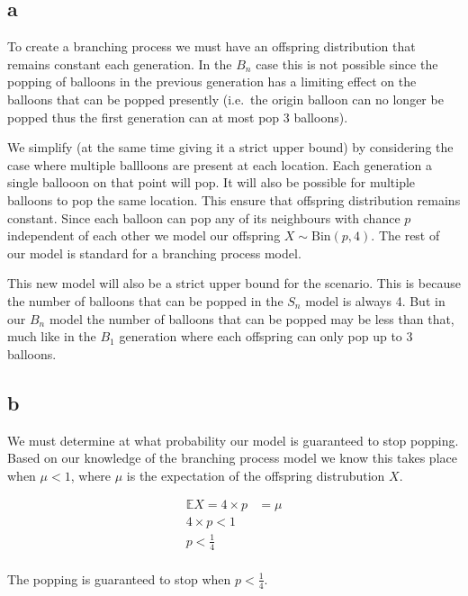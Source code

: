 \documentclass{article}
\newcommand{\expect}{\mathbb{E}}
\begin{document}
\subsection{a}
To create a branching process we must have an offspring distribution that
remains constant each generation. In the $B_n$ case this is not possible
since the popping of balloons in the previous generation has a limiting
effect on the balloons that can be popped presently (i.e.\ the origin
balloon can no longer be popped thus the first generation can at most pop
3 balloons).

We simplify (at the same time giving it a strict upper bound) by considering
the case where multiple ballloons are present at each location. Each generation
a single ballooon on that point will pop. It will also be possible for multiple
balloons to pop the same location. This ensure that offspring distribution
remains constant. Since each balloon can pop any of its neighbours with
chance $p$ independent of each other we model our offspring
$X \sim \text{Bin}(p,4)$. The rest of our model is standard for a branching
process model.

This new model will also be a strict upper bound for the scenario. This is
because the number of balloons that can be popped in the $S_n$ model is always
4. But in our $B_n$ model the number of balloons that can be popped may be
less than that, much like in the $B_1$ generation where each offspring
can only pop up to 3 balloons.

\subsection{b}
We must determine at what probability our model is guaranteed to stop popping.
Based on our knowledge of the branching process model we know this takes place
when $\mu < 1$, where $\mu$ is the expectation of the offspring distrubution
$X$.

\begin{align*}
    \expect X = 4 \times p &= \mu \\
    4\times p < 1  \\
    p < \frac{1}{4}  \\
\end{align*}

The popping is guaranteed to stop when $p < \frac{1}{4}$.
\end{document}
